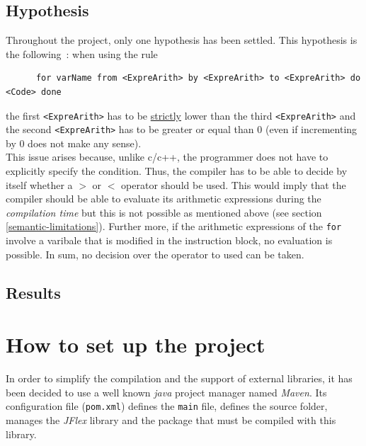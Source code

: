\documentclass[a4paper,11pt]{article}
\begin{document}
  \subsection{Hypothesis}
    Throughout the project, only one hypothesis has been settled. This hypothesis is the following~: when using the rule
    \begin{verbatim}
      for varName from <ExpreArith> by <ExpreArith> to <ExpreArith> do <Code> done
    \end{verbatim}
    the first \verb|<ExpreArith>| has to be \underline{strictly} lower than the third \verb|<ExpreArith>| and the second \verb|<ExpreArith>| has to be greater or equal than $0$ (even if incrementing by $0$ does not make any sense).\\
    This issue arises because, unlike c/c++, the programmer does not have to explicitly specify the condition. Thus, the compiler has to be able to decide by itself whether a $>$ or $<$ operator should be used. This would imply that the compiler should be able to evaluate its arithmetic expressions during the \textit{compilation time} but this is not possible as mentioned above (see section \ref{semantic-limitations}). Further more, if the arithmetic expressions of the \verb|for| involve a varibale that is modified in the instruction block, no evaluation is possible. In sum, no decision over the operator to used can be taken.
  
  \subsection{Results}
    

\section{How to set up the project}
  In order to simplify the compilation and the support of external libraries, it has been decided to use a well known \textit{java} project manager named \textit{Maven}. Its configuration file (\verb|pom.xml|) defines the \verb|main| file, defines the source folder, manages the \textit{JFlex} library and the package that must be compiled with this library.
\end{document}
